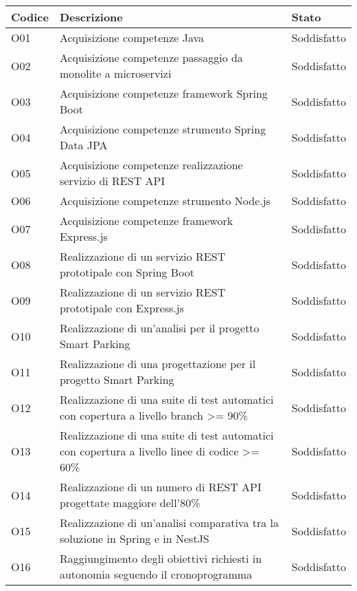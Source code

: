 \begin{table}
    \begin{tabular}{|p{1.5cm}|p{7.7cm}|p{2cm}|} 
    \hline
    \textbf{Codice} & \textbf{Descrizione} & \textbf{Stato} \\ 
    \hline
    O01 & Acquisizione competenze Java & Soddisfatto \\
    \hline
    O02 & Acquisizione competenze passaggio da monolite a microservizi & Soddisfatto \\
    \hline
    O03 & Acquisizione competenze framework Spring Boot & Soddisfatto \\
    \hline
    O04 & Acquisizione competenze strumento Spring Data JPA & Soddisfatto \\
    \hline
    O05 & Acquisizione competenze realizzazione servizio di REST API & Soddisfatto \\
    \hline
    O06 & Acquisizione competenze strumento Node.js & Soddisfatto \\
    \hline
    O07 & Acquisizione competenze framework Express.js & Soddisfatto \\
    \hline
    O08 & Realizzazione di un servizio REST prototipale con Spring Boot & Soddisfatto \\
    \hline
    O09 & Realizzazione di un servizio REST prototipale con Express.js & Soddisfatto \\
    \hline
    O10 & Realizzazione di un'analisi per il progetto Smart Parking & Soddisfatto \\
    \hline
    O11 & Realizzazione di una progettazione per il progetto Smart Parking & Soddisfatto \\
    \hline
    O12 & Realizzazione di una suite di test automatici con copertura a livello branch >= 90\% & Soddisfatto \\
    \hline
    O13 & Realizzazione di una suite di test automatici con copertura a livello linee di codice >= 60\% & Soddisfatto \\
    \hline
    O14 & Realizzazione di un numero di REST API progettate maggiore dell'80\% & Soddisfatto \\
    \hline
    O15 & Realizzazione di un'analisi comparativa tra la soluzione in Spring e in NestJS & Soddisfatto \\
    \hline
    O16 & Raggiungimento degli obiettivi richiesti in autonomia seguendo il cronoprogramma & Soddisfatto \\
    \hline
    \end{tabular}
\end{table}

